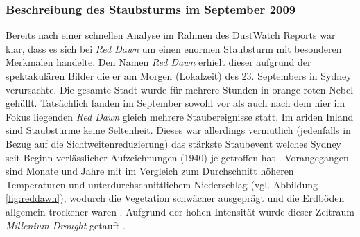 \documentclass[12pt,a4paper,onecolumn]{scrartcl}
\begin{document}
\subsubsection{Beschreibung des Staubsturms im September 2009} \label{sec:reddawn}
Bereits nach einer schnellen Analyse im Rahmen des DustWatch Reports \citep{Leys.2009} war klar, dass es sich bei \textit{Red Dawn} um einen enormen Staubsturm mit besonderen Merkmalen handelte. Den Namen \textit{Red Dawn} erhielt dieser aufgrund der spektakulären Bilder die er am Morgen (Lokalzeit) des 23. Septembers in Sydney verursachte. Die gesamte Stadt wurde für mehrere Stunden in orange-roten Nebel gehüllt. Tatsächlich fanden im September sowohl vor als auch nach dem hier im Fokus liegenden \textit{Red Dawn} gleich mehrere Staubereignisse statt. Im ariden Inland sind Staubstürme keine Seltenheit. Dieses war allerdings vermutlich (jedenfalls in Bezug auf die Sichtweitenreduzierung) das stärkste Staubevent welches Sydney seit Beginn verlässlicher Aufzeichnungen (1940) je getroffen hat \citep{Leys.2011}. Vorangegangen sind Monate und Jahre mit im Vergleich zum Durchschnitt höheren Temperaturen und unterdurchschnittlichem Niederschlag (vgl. Abbildung \ref{fig:reddawn}), wodurch die Vegetation schwächer ausgeprägt und die Erdböden allgemein trockener waren \citep{Leys.2011}. Aufgrund der hohen Intensität wurde dieser Zeitraum \textit{Millenium Drought} getauft \citep{Deckker.2014}.
\end{document}
